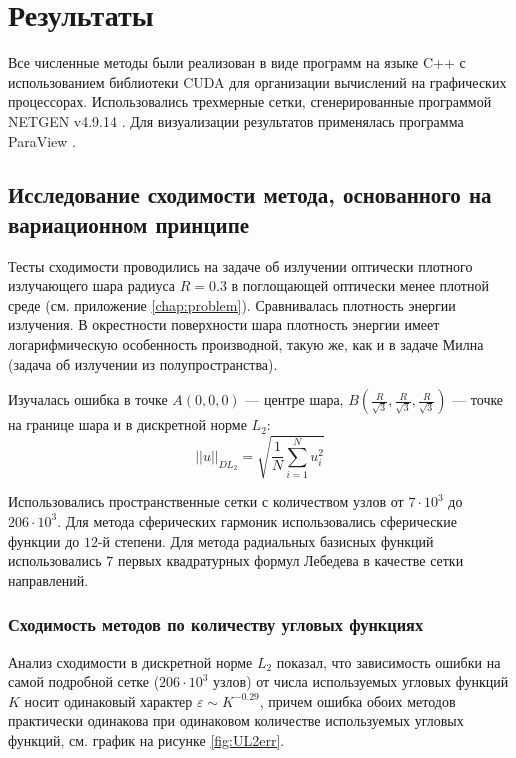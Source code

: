 \chapter{Результаты}

Все численные методы были реализован в виде программ на языке C++ с использованием библиотеки CUDA \cite{cuda2015} для организации вычислений на графических процессорах. Использовались трехмерные сетки, сгенерированные программой NETGEN v4.9.14 \cite{Netgen2009}.
Для визуализации результатов применялась программа ParaView \cite{Paraview2004}.

\section{Исследование сходимости метода, основанного на вариационном принципе}

Тесты сходимости проводились на задаче об излучении оптически плотного излучающего шара радиуса $R = 0.3$ в поглощающей оптически менее плотной среде (см. приложение \ref{chap:problem}). Сравнивалась плотность энергии излучения. В окрестности поверхности шара плотность энергии имеет логарифмическую особенность производной, такую же, как и в задаче Милна (задача об излучении из полупространства).

Изучалась ошибка в точке $A(0, 0, 0)$ --- центре шара, $B\left(\frac{R}{\sqrt{3}}, \frac{R}{\sqrt{3}}, \frac{R}{\sqrt{3}}\right)$ --- точке на границе шара и в дискретной норме $L_2$:
\[
||u||_{DL_2} = \sqrt{\frac{1}{N}\sum_{i=1}^N u_i^2}
\]

Использовались пространственные сетки с количеством узлов от $7 \cdot 10^3$ до $206 \cdot 10^3$. Для метода сферических гармоник использовались сферические функции до $12$-й степени. Для метода радиальных базисных функций использовались $7$ первых квадратурных формул Лебедева в качестве сетки направлений. 

\subsection{Сходимость методов по количеству угловых функциях}

Анализ сходимости в дискретной норме $L_2$ показал, что зависимость ошибки на самой подробной сетке ($206 \cdot 10^3$ узлов) от числа используемых угловых функций $K$ носит одинаковый характер $\varepsilon \sim K^{-0.29}$, причем ошибка обоих методов практически одинакова при одинаковом количестве используемых угловых функций, см. график на рисунке \ref{fig:UL2err}.

